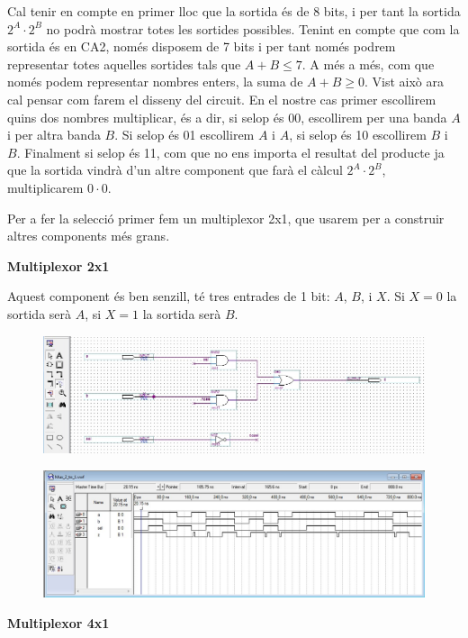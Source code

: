 \documentclass[12pt, a4papre]{article}
\begin{document}
	Cal tenir en compte en primer lloc que la sortida és de 8 bits, i per tant la sortida $2^A\cdot2^B$ no podrà mostrar totes les sortides possibles. Tenint en compte que com la sortida és en CA2, només disposem de 7 bits i per tant només podrem representar totes aquelles sortides tals que $A+B \leqslant 7$. A més a més, com que només podem representar nombres enters, la suma de $A+B \geqslant 0$.	
	Vist això ara cal pensar com farem el disseny del circuit. En el nostre cas primer escollirem quins dos nombres multiplicar, és a dir, si selop és 00, escollirem per una banda $A$ i per altra banda $B$. Si selop és 01 escollirem $A$ i $A$, si selop és 10 escollirem $B$ i $B$. Finalment si selop és 11, com que no ens importa el resultat del producte ja que la sortida vindrà d'un altre component que farà el càlcul $2^A\cdot2^B$, multiplicarem $0\cdot 0$.
	
	Per a fer la selecció primer fem un multiplexor 2x1, que usarem per a construir altres components més grans.
	
	\textbf{\large{Multiplexor 2x1}}

	Aquest component és ben senzill, té tres entrades de 1 bit: $A$, $B$, i $X$. Si $X=0$ la sortida serà $A$, si $X=1$ la sortida serà $B$.
	
		\begin{center}
	\begin{figure}[H]
		\begin{center}
		\includegraphics[width=150mm]{multiplexor2_1.jpeg}
		\end{center}
	\end{figure}
	
	\end{center}
	
	\begin{center}
	\begin{figure}[H]
		\begin{center}
		\includegraphics[width=150mm]{simulaciofeta.jpeg}
		\end{center}
	\end{figure}
	
	\end{center}
	\textbf{\large{Multiplexor 4x1}}
	
\end{document}
